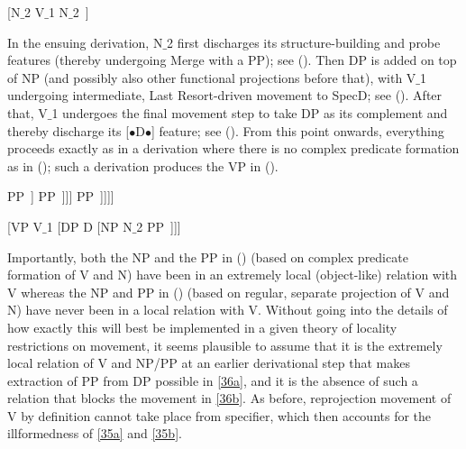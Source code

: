 \documentclass[output=paper
,modfonts
,nonflat]{langsci/langscibook}
\begin{document}
\ea\relax\label{ex:mueller:39} [N$\_$2 V$\_$1 N$\_$2~] \z

In the ensuing derivation, N$\_$2 first discharges its structure-building
and probe features (thereby undergoing Merge with a PP); see (\Next[a]).
Then
DP is added on top of NP (and possibly also other functional projections
before that), with V$\_$1 undergoing intermediate, Last Resort-driven
movement to SpecD; see (\Next[a]). After that, V$\_$1 undergoes the
final  movement step to take DP as its complement and thereby
discharge its [{\small $\bullet$}D{\small $\bullet$}] feature; see
(\Next[b]). From this point onwards, everything proceeds exactly as in
a derivation where there is no complex predicate formation as in
(\Next); such a derivation produces the VP in (\NNext). 

\ea\label{ex:mueller:40}
\ea\relax [NP [N$\_$2 V$\_$1 N$\_$2~] PP~]
\ex\relax [DP V$\_$1 [D$'$ D [NP [N$\_$2 t$\_$1 N$\_$2~] PP~]]]
\ex\relax [VP V$\_$1 [DP t$'$\_$1$ [D$'$ D [NP [N$\_$2 t$\_$1 N$\_$2~] PP~]]]]
\z
\z

\ea\label{ex:mueller:41} [VP V$\_$1 [DP D [NP N$\_$2 PP~]]]\z

Importantly, both the NP and the PP in (\LLast[c]) (based on complex
predicate formation of V and N) have been in an extremely local
(object-like) relation with V whereas the NP and PP in (\Last) (based
on regular, separate projection of V and N) have never been in a local
relation with V. Without going into the details of how exactly this
will best be implemented in a given theory of locality restrictions on movement, it
seems plausible to assume that it is the extremely local relation of V
and NP/PP at an earlier derivational step that makes extraction of PP
from DP possible in  \ref{36a}, and it is the absence of such a relation that blocks
the movement in \ref{36b}. As before, reprojection movement of V
by definition cannot take place from specifier, which then accounts
for the illformedness of \ref{35a} and \ref{35b}.
\end{document}
